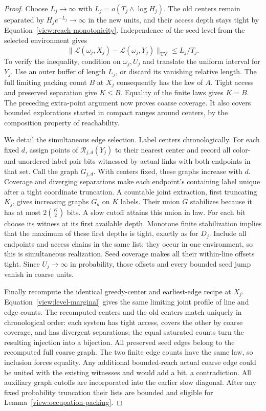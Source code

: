 \begin{proof}
Choose $L_j\to\infty$ with $L_j=o(T_j\wedge\log H_j)$.  The old centers
remain separated by $H_je^{-L_j}\to\infty$ in the new units, and their
access depth stays tight by Equation~\eqref{view:reach-monotonicity}.
Independence of the seed level from the selected environment gives
\begin{equation}\label{view:level-marginal}
 \bigl\|\mathcal L(\omega_j,X_j)-
 \mathcal L(\omega_j,Y_j)\bigr\|_{\mathrm{TV}}
 \le L_j/T_j.
\end{equation}
To verify the inequality, condition on $\omega_j,U_j$ and translate the
uniform interval for $Y_j$.  Use an outer buffer of length $L_j$, or
discard its vanishing relative length.  The full limiting packing count
$B$ at $X_j$ consequently has the law of $A$.  Tight access and preserved
separation give $K\le B$.  Equality of the finite laws gives $K=B$.
The preceding extra-point argument now proves coarse coverage.  It also
covers bounded explorations started in compact ranges around centers,
by the composition property of reachability.

We detail the simultaneous edge selection.  Label centers chronologically.
For each fixed $d$, assign points of $\mathcal R_{j,d}(Y_j)$ to their
nearest center and record all color-and-unordered-label-pair bits
witnessed by actual links with both endpoints in that set.  Call the
graph $G_{j,d}$.  With centers fixed, these graphs increase with $d$.
Coverage and diverging separations make each endpoint's containing label
unique after a tight coordinate truncation.  A countable joint extraction,
first truncating $K_j$, gives increasing graphs $G_d$ on $K$ labels.
Their union $G$ stabilizes because it has at most $2\binom K2$ bits.
A slow cutoff attains this union in law.  For each bit choose its witness
at its first available depth.  Monotone finite stabilization implies that
the maximum of these first depths is tight, exactly as for $D_j$.
Include all endpoints and access chains in the same list; they occur in
one environment, so this is simultaneous realization.  Seed coverage
makes all their within-line offsets tight.  Since $U_j\to\infty$ in
probability, those offsets and every bounded seed jump vanish in coarse
units.

Finally recompute the identical greedy-center and earliest-edge recipe
at $X_j$.  Equation~\eqref{view:level-marginal} gives the same limiting
joint profile of line and edge counts.  The recomputed centers and the
old centers match uniquely in chronological order: each system has tight
access, covers the other by coarse coverage, and has divergent
separations; the equal saturated counts turn the resulting injection
into a bijection.  All preserved seed edges belong to the recomputed
full coarse graph.  The two finite edge counts have the same law, so
inclusion forces equality.  Any additional bounded-reach actual coarse
edge could be united with the existing witnesses and would add a bit,
a contradiction.  All auxiliary graph cutoffs are incorporated into the
earlier slow diagonal.  After any fixed probability truncation their
lists are bounded and eligible for Lemma~\ref{view:occupation-packing}.
\end{proof}

